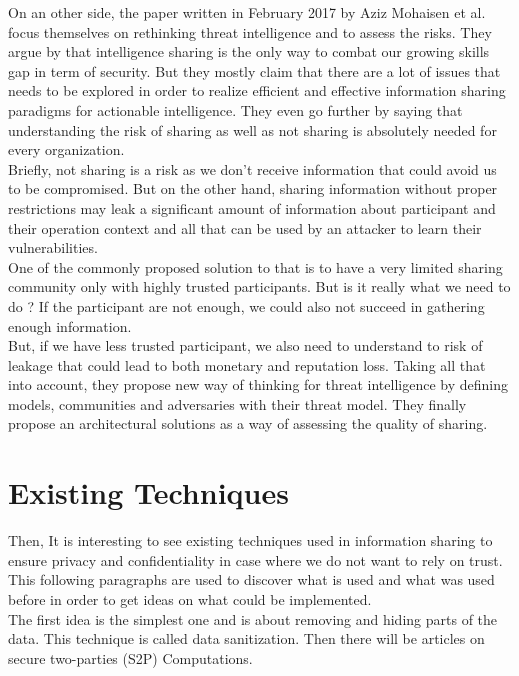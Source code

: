\documentclass{eplmastersthesis}
\begin{document}
On an other side, the paper written in February 2017 by Aziz Mohaisen et al. \cite{mohaisen2017rethinking} focus themselves on rethinking threat intelligence and to assess the risks. They argue by \cite{MalikThreat} that intelligence sharing is the only way to combat our growing skills gap in term of security. But they mostly claim that there are a lot of issues that needs to be explored in order to realize efficient and effective information sharing paradigms for actionable intelligence. They even go further by saying that understanding the risk of sharing as well as not sharing is absolutely needed for every organization.\\
Briefly, not sharing is a risk as we don't receive information that could avoid us to be compromised. But on the other hand, sharing information without proper restrictions may leak a significant amount of information about participant and their operation context and all that can be used by an attacker to learn their vulnerabilities.\\
One of the commonly proposed solution to that is to have a very limited sharing community only with highly trusted participants. But is it really what we need to do ? If the participant are not enough, we could also not succeed in gathering enough information.\\
But, if we have less trusted participant, we also need to understand to risk of leakage that could lead to both monetary and reputation loss. Taking all that into account, they propose new way of thinking for threat intelligence by defining models, communities and adversaries with their threat model.
They finally propose an architectural solutions as a way of assessing the quality of sharing.

\section{Existing Techniques}
Then, It is interesting to see existing techniques used in information sharing to ensure privacy and confidentiality in case where we do not want to rely on trust. This following paragraphs are used to discover what is used and what was used before in order to get ideas on what could be implemented.\\

The first idea is the simplest one and is about removing and hiding parts of the data. This technique is called data sanitization. Then there will be articles on secure two-parties (S2P) Computations.\\
\end{document}
